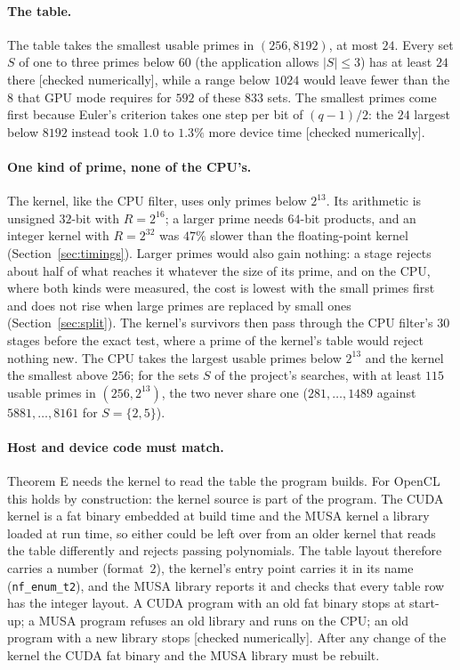 \documentclass[10pt,a4paper]{article}
\newcommand{\code}[1]{\texttt{#1}}
\newcommand{\stnum}{\textsf{\small[checked numerically]}\xspace}
\theoremstyle{plain}
\theoremstyle{definition}
\begin{document}
\paragraph{The table.}  The table takes the smallest usable primes in $(256,8192)$, at most $24$.  Every set $S$ of one to three primes below $60$ (the application
allows $|S|\le3$) has at least $24$ there \stnum, while a range below $1024$ would leave fewer than the $8$ that GPU mode requires for $592$ of these $833$ sets.  The
smallest primes come first because Euler's criterion takes one step per bit of $(q-1)/2$: the $24$ largest below $8192$ instead took $1.0$ to $1.3\%$ more device
time \stnum.

\paragraph{One kind of prime, none of the CPU's.}  The kernel, like the CPU filter, uses only primes below $2^{13}$.  Its arithmetic is unsigned $32$-bit with
$R=2^{16}$; a larger prime needs $64$-bit products, and an integer kernel with $R=2^{32}$ was $47\%$ slower than the floating-point kernel
(Section~\ref{sec:timings}).  Larger primes would also gain nothing: a stage rejects about half of what reaches it whatever the size of its prime, and on the CPU,
where both kinds were measured, the cost is lowest with the small primes first and does not rise when large primes are replaced by small ones
(Section~\ref{sec:split}).  The kernel's survivors then pass through the CPU filter's $30$ stages before the exact test, where a prime of the kernel's table would
reject nothing new.  The CPU takes the largest usable primes below $2^{13}$ and the kernel the smallest above $256$; for the sets $S$ of the project's searches,
with at least $115$ usable primes in $(256,2^{13})$, the two never share one ($281,\dots,1489$ against $5881,\dots,8161$ for $S=\{2,5\}$).

\paragraph{Host and device code must match.}  Theorem E needs the kernel to read the table the program builds.  For OpenCL this holds by construction: the kernel
source is part of the program.  The CUDA kernel is a fat binary embedded at build time and the MUSA kernel a library loaded at run time, so either could be left over
from an older kernel that reads the table differently and rejects passing polynomials.  The table layout therefore carries a number (format~$2$), the kernel's entry
point carries it in its name (\code{nf\_enum\_t2}), and the MUSA library reports it and checks that every table row has the integer layout.  A CUDA program with
an old fat binary stops at start-up; a MUSA program refuses an old library and runs on the CPU; an old program with a new library stops \stnum.  After any change of
the kernel the CUDA fat binary and the MUSA library must be rebuilt.
\end{document}
